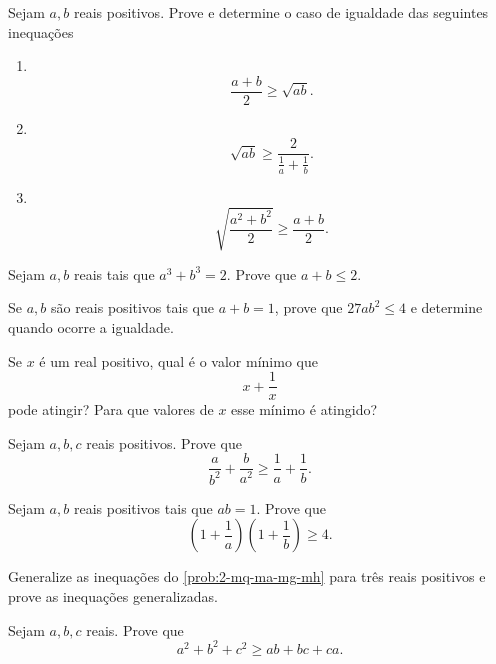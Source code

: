 \documentclass[10pt,a4paper]{article}
\begin{document}
	\begin{prob}\label{prob:2-mq-ma-mg-mh}
		Sejam $a, b$ reais positivos. Prove e determine o caso de igualdade das seguintes inequações
		\begin{enumerate}[label = (\alph*), itemsep = 0ex]
			\item \ \vspace{-\baselineskip}\[
					\frac{a+b}{2} \ge \sqrt{ab}.
				\]

			\item \ \vspace{-\baselineskip}\[
					\sqrt{ab} \ge \frac{2}{\frac{1}{a} + \frac{1}{b}}.
				\]

			\item \ \vspace{-\baselineskip}\[
					\sqrt{\frac{a^2 + b^2}{2}} \ge \frac{a + b}{2}.
				\]
		\end{enumerate}
	\end{prob}
	
	\begin{prob}
		Sejam $a, b$ reais tais que $a^3 + b^3 = 2$. Prove que $a + b \le 2$.
	\end{prob}

	\begin{prob}
		Se $a, b$ são reais positivos tais que $a + b = 1$, prove que $27ab^2 \le 4$ e determine quando ocorre a igualdade.
	\end{prob}

	\begin{prob}
		Se $x$ é um real positivo, qual é o valor mínimo que \[
			x + \frac1x
		\] pode atingir? Para que valores de $x$ esse mínimo é atingido?
	\end{prob}

	\begin{prob}
		Sejam $a, b, c$ reais positivos. Prove que \[
			\frac{a}{b^2} + \frac{b}{a^2} \ge \frac{1}{a} + \frac{1}{b}.
		\]
	\end{prob}

	\begin{prob}
		Sejam $a, b$ reais positivos tais que $ab = 1$. Prove que \[
			\left(1+\frac1a\right)
			\left(1+\frac1b\right)
			\ge 4.
		\]
	\end{prob}


	\begin{prob}
		Generalize as inequações do \cref{prob:2-mq-ma-mg-mh} para três reais positivos e prove as inequações generalizadas.
	\end{prob}

	\begin{prob}
		Sejam $a, b, c$ reais. Prove que \[
			a^2 + b^2 + c^2 \ge ab + bc + ca.
		\]
	\end{prob}
\end{document}
